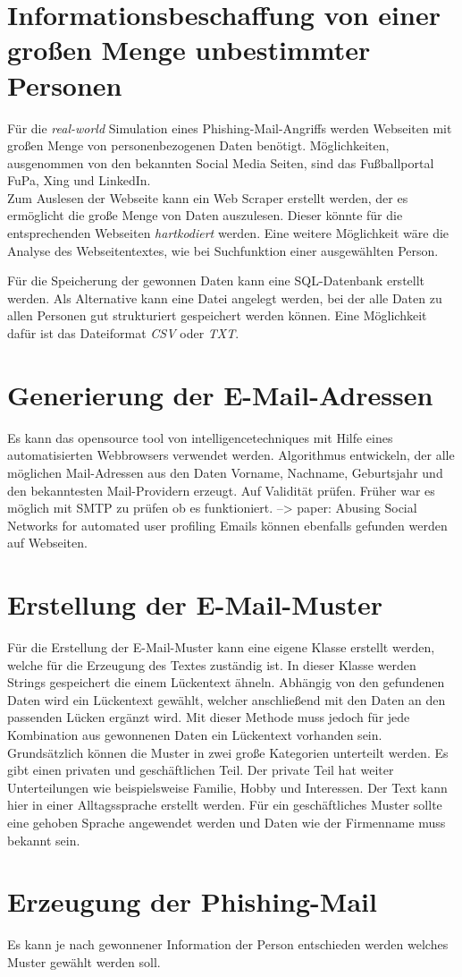 \section{Informationsbeschaffung von einer großen Menge unbestimmter Personen}
Für die \textit{real-world} Simulation eines Phishing-Mail-Angriffs werden Webseiten mit großen Menge von personenbezogenen Daten benötigt. Möglichkeiten, ausgenommen von den bekannten Social Media Seiten, sind das Fußballportal FuPa, Xing und LinkedIn.\\
Zum Auslesen der Webseite kann ein Web Scraper erstellt werden, der es ermöglicht die große Menge von Daten auszulesen. Dieser könnte für die entsprechenden Webseiten \textit{hartkodiert} werden. Eine weitere Möglichkeit wäre die Analyse des Webseitentextes, wie bei Suchfunktion einer ausgewählten Person.

Für die Speicherung der gewonnen Daten kann eine SQL-Datenbank erstellt werden.
Als Alternative kann eine Datei angelegt werden, bei der alle Daten zu allen Personen gut strukturiert gespeichert werden können. Eine Möglichkeit dafür ist das Dateiformat \textit{CSV} oder \textit{TXT}.%


\section{Generierung der E-Mail-Adressen}
Es kann das opensource tool von intelligencetechniques mit Hilfe eines automatisierten Webbrowsers verwendet werden. Algorithmus entwickeln, der alle möglichen Mail-Adressen aus den Daten Vorname, Nachname, Geburtsjahr und den bekanntesten Mail-Providern erzeugt.
Auf Validität prüfen. Früher war es möglich mit SMTP zu prüfen ob es funktioniert. --> paper: Abusing Social Networks for automated user profiling
Emails können ebenfalls gefunden werden auf Webseiten.
\section{Erstellung der E-Mail-Muster}
Für die Erstellung der E-Mail-Muster kann eine eigene Klasse erstellt werden, welche für die Erzeugung des Textes zuständig ist. In dieser Klasse werden Strings gespeichert die einem Lückentext ähneln. Abhängig von den gefundenen Daten wird ein Lückentext gewählt, welcher anschließend mit den Daten an den passenden Lücken ergänzt wird. Mit dieser Methode muss jedoch für jede Kombination aus gewonnenen Daten ein Lückentext vorhanden sein.\\
Grundsätzlich können die Muster in zwei große Kategorien unterteilt werden. Es gibt einen privaten und geschäftlichen Teil. Der private Teil hat weiter Unterteilungen wie beispielsweise Familie, Hobby und Interessen. Der Text kann hier in einer Alltagssprache erstellt werden. Für ein geschäftliches Muster sollte eine gehoben Sprache angewendet werden und Daten wie der Firmenname muss bekannt sein. 
\section{Erzeugung der Phishing-Mail}
Es kann je nach gewonnener Information der Person entschieden werden welches Muster gewählt werden soll.
